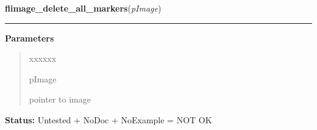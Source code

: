     \label{xformslib:library:flimage_delete_all_markers}

    \vspace{0.5ex}

\hspace{.8\funcindent}\begin{boxedminipage}{\funcwidth}

    \raggedright \textbf{flimage\_delete\_all\_markers}(\textit{pImage})

    \vspace{-1.5ex}

    \rule{\textwidth}{0.5\fboxrule}
\setlength{\parskip}{2ex}
\setlength{\parskip}{1ex}
      \textbf{Parameters}
      \vspace{-1ex}

      \begin{quote}
        \begin{Ventry}{xxxxxx}

          \item[pImage]

          pointer to image

        \end{Ventry}

      \end{quote}

\textbf{Status:} Untested + NoDoc + NoExample = NOT OK



    \end{boxedminipage}

    \label{xformslib:library:flimage_render_annotation}

    \vspace{0.5ex}

